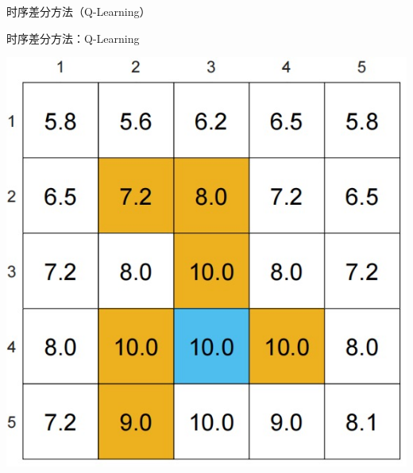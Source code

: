 \begin{section}{时序差分方法\alert{（Q-Learning）}}
\begin{frame}{时序差分方法：Q-Learning}
\begin{center}
\begin{minipage}{0.3\textwidth}
            \includegraphics[width=\linewidth]{assets/OptimalStateValue.jpg}
        \end{minipage}
    \end{center}
\end{frame}


\end{section}
